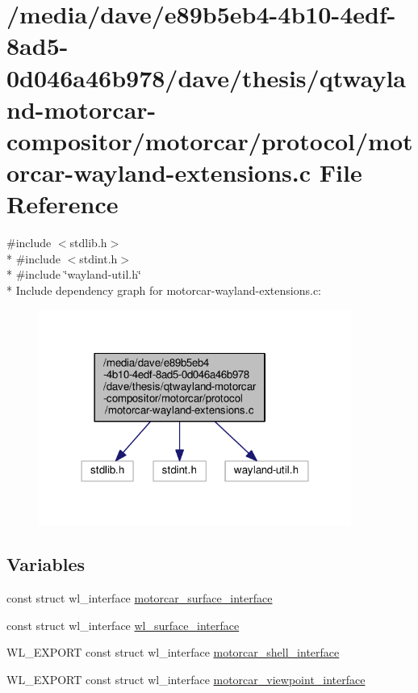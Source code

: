 \hypertarget{protocol_2motorcar-wayland-extensions_8c}{\section{/media/dave/e89b5eb4-\/4b10-\/4edf-\/8ad5-\/0d046a46b978/dave/thesis/qtwayland-\/motorcar-\/compositor/motorcar/protocol/motorcar-\/wayland-\/extensions.c File Reference}
\label{protocol_2motorcar-wayland-extensions_8c}
}
{\ttfamily \#include $<$stdlib.\-h$>$}\\*
{\ttfamily \#include $<$stdint.\-h$>$}\\*
{\ttfamily \#include \char`\"{}wayland-\/util.\-h\char`\"{}}\\*
Include dependency graph for motorcar-\/wayland-\/extensions.c\-:\nopagebreak
\begin{figure}[H]
\begin{center}
\leavevmode
\includegraphics[width=290pt]{protocol_2motorcar-wayland-extensions_8c__incl}
\end{center}
\end{figure}
\subsection*{Variables}
\begin{DoxyCompactItemize}
\item 
const struct wl\-\_\-interface \hyperlink{protocol_2motorcar-wayland-extensions_8c_a56acb8594d0103b3705453e8ea77915b}{motorcar\-\_\-surface\-\_\-interface}
\item 
const struct wl\-\_\-interface \hyperlink{protocol_2motorcar-wayland-extensions_8c_ab5b94bcc25b21d2fdd945533016d0e33}{wl\-\_\-surface\-\_\-interface}
\item 
W\-L\-\_\-\-E\-X\-P\-O\-R\-T const struct wl\-\_\-interface \hyperlink{protocol_2motorcar-wayland-extensions_8c_af93f16d847b10210463edbe6017b9517}{motorcar\-\_\-shell\-\_\-interface}
\item 
W\-L\-\_\-\-E\-X\-P\-O\-R\-T const struct wl\-\_\-interface \hyperlink{protocol_2motorcar-wayland-extensions_8c_a75e24dc8eb5259b6e2ec9ac54c4a201b}{motorcar\-\_\-viewpoint\-\_\-interface}
\end{DoxyCompactItemize}


